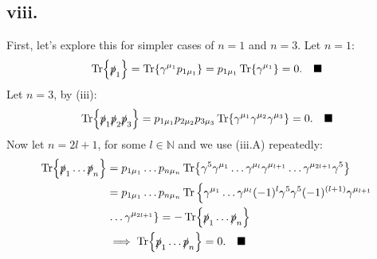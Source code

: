 \documentclass{article}
\newcommand{\slashp}{\slashed{p}}
\begin{document}
\subsection*{viii.}
First, let's explore this for simpler cases of $n=1$ and $n=3$. Let $n=1$:
\begin{equation}
    \begin{split}
        \Tr{\slashp_1}=\Tr{\gamma^{\mu_1}p_{1\mu_1}} = p_{1\mu_1}\Tr{\gamma^{\mu_1}} = 0. \quad \blacksquare
    \end{split}
\end{equation}
Let $n=3$, by (iii):
\begin{equation}
    \begin{split}
    \Tr{\slashp_1\slashp_2\slashp_3}=p_{1\mu_1}p_{2\mu_2}p_{3\mu_3}\Tr{\gamma^{\mu_1}\gamma^{\mu_2}\gamma^{\mu_3}} = 0. \quad \blacksquare
    \end{split}
\end{equation}
Now let $n=2l+1$, for some $l \in \mathbb{N}$ and we use (iii.A) repeatedly:
\begin{equation}
    \begin{split}
        \Tr{\slashp_1 \dots \slashp_n}&=p_{1 \mu_1}\dots p_{n \mu_n}\Tr{\gamma^5\gamma^{\mu_1}\dots \gamma^{\mu_l} \gamma^{\mu_{l+1}} \dots \gamma^{\mu_{2l+1}}\gamma^{5}}\\
        &=p_{1 \mu_1}\dots p_{n \mu_n}\Tr\left\{\gamma^{\mu_1}\dots \gamma^{\mu_l}(-1)^l \gamma^5 \gamma^5 (-1)^{(l+1)}\gamma^{\mu_{l+1}}\right. \\ & \left.\dots \gamma^{\mu_{2l+1}}\right\}=-\Tr{\slashp_1 \dots \slashp_n} \\ & \implies \Tr{\slashp_1 \dots \slashp_n}=0. \quad \blacksquare
    \end{split}
\end{equation}
\end{document}
